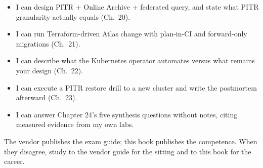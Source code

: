 \begin{itemize}
    \item[$\square$] I can design PITR + Online Archive + federated query, and state what PITR granularity actually equals (Ch.~20).
    \item[$\square$] I can run Terraform-driven Atlas change with plan-in-CI and forward-only migrations (Ch.~21).
    \item[$\square$] I can describe what the Kubernetes operator automates versus what remains your design (Ch.~22).
    \item[$\square$] I can execute a PITR restore drill to a new cluster and write the postmortem afterward (Ch.~23).
    \item[$\square$] I can answer Chapter 24's five synthesis questions without notes, citing measured evidence from my own labs.
\end{itemize}

\begin{notebox}
The vendor publishes the exam guide; this book publishes the competence. When they disagree,
study to the vendor guide for the sitting and to this book for the career.
\end{notebox}
